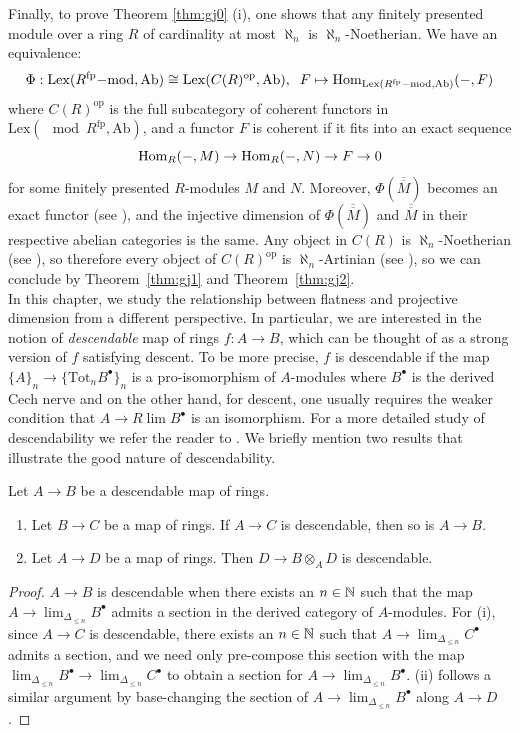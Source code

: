 Finally, to prove Theorem \ref{thm:gj0} (i), one shows that any finitely presented module over a ring $R$ of cardinality at most $\aleph_n$
is $\aleph_n$-Noetherian. We have an equivalence:
\[\Phi: \mathrm{Lex}({R^{\mathrm{fp}}}\mathrm{-mod}, \mathrm{Ab}) \cong \mathrm{Lex}(C(R)^{\text{op}}, \mathrm{Ab}), \; \; F \mapsto \operatorname{Hom}_{\mathrm{Lex}({R^{\mathrm{fp}}}\mathrm{-mod}, \mathrm{Ab})}(-,F)\]
where $C(R)^{\text{op}}$ is the full subcategory of coherent functors in $\mathrm{Lex}(\mod{R^{\mathrm{fp}}}, \mathrm{Ab})$,
and a functor $F$ is coherent if it fits into an exact sequence
\[\operatorname{Hom}_R(-, M) \rightarrow \operatorname{Hom}_R(-, N) \rightarrow F \rightarrow 0\]
for some finitely presented $R$-modules $M$ and $N$. Moreover, $\Phi(\overline{\overline{M}})$ becomes an exact functor (see \cite[Lemma 5.3]{gj}), and the injective dimension
of $\Phi(\overline{\overline{M}})$ and $\overline{\overline{M}}$ in their respective abelian categories is the same. 
Any object in $C(R)$ is $\aleph_n$-Noetherian (see \cite[Theorem 7.9]{gj}), so therefore
every object of $C(R)^{\text{op}}$ is $\aleph_n$-Artinian (see \cite[Theorem 5.6]{gj}), so we can conclude by Theorem~\ref{thm:gj1} and Theorem~\ref{thm:gj2}.\\
\indent In this chapter, we study the relationship between flatness and projective dimension from a different perspective.
In particular, we are interested in the notion of \textit{descendable} map of rings $f: A \to B$, which can be thought of as a strong version of $f$ satisfying descent. 
To be more precise, $f$ is descendable if the map $\{A\}_n \to \{ \text{Tot}_n B^{\bullet}\}_n$ is a pro-isomorphism of $A$-modules where $B^{\bullet}$ 
is the derived Cech nerve and on the other hand, for descent, one usually requires the weaker condition that 
$A \to R\lim B^{\bullet}$ is an isomorphism. 
For a more detailed study of descendability we refer the reader to \cite{DescendMathew}. We briefly mention two results that illustrate the good nature of descendability.
\begin{lemma}
Let $A \to B$ be a descendable map of rings.
\begin{enumerate}
\item[(i)] Let $B \to C$ be a map of rings. If $A \to C$ is descendable, then so is $A \to B$.
\item[(ii)] Let $A \to D$ be a map of rings. Then $D \to B \otimes_A D$ is descendable.
\end{enumerate}
\end{lemma}
\begin{proof}
$A \to B$ is descendable when there exists an $n \in \mathbb{N}$ such that the map $A \to \lim_{\Delta_{\le n}} B^{\bullet}$ admits a section in the derived category of $A$-modules.
For (i), since $A \to C$ is descendable, there exists an $n \in \mathbb{N}$ such that $A \to \lim_{\Delta_{\le n}} C^{\bullet}$ admits a section, and we need only pre-compose this section with
the map $\lim_{\Delta_{\le n}} B^{\bullet} \to \lim_{\Delta_{\le n}} C^{\bullet}$ to obtain a section for $A \to \lim_{\Delta_{\le n}} B^{\bullet}$. 
(ii) follows a similar argument by base-changing the section of $A \to \lim_{\Delta_{\le n}} B^{\bullet}$ along $A \to D$.
\end{proof}
